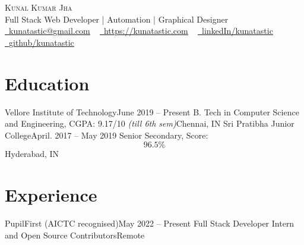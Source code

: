 \documentclass[letterpaper,11pt]{article}
\begin{document}
\begin{center}
    {\Huge \scshape Kunal Kumar Jha} \\ \vspace{1pt}
    Full Stack Web Developer | Automation | Graphical Designer   \\ \vspace{1pt}
    \href{mailto:kunatastic@gmail.com}{\raisebox{-0.2\height}\faEnvelope\  \underline{kunatastic@gmail.com}} ~ 
    \href{https://kunatastic.com}{\raisebox{-0.2\height}\faLink\ \underline{https://kunatastic.com}} ~ 
    \href{https://linkedin.com/in/kunatastic/}{\raisebox{-0.2\height}\faLinkedin\ \underline{linkedIn/kunatastic}}  ~
    \href{https://github.com/kunatatsic}{\raisebox{-0.2\height}\faGithub\ \underline{github/kunatastic}}
    \vspace{-8pt}
\end{center}

\section{Education}
  \resumeSubHeadingListStart
    \resumeSubheading
      {Vellore Institute of Technology}{June 2019 -- Present}
      {B. Tech in Computer Science and Engineering, CGPA: 9.17/10 \emph{(till 6th sem)}}{Chennai, IN}
    \resumeSubheading
      {Sri Pratibha Junior College}{April. 2017 -- May 2019}
      {Senior Secondary, Score: $$96.5\%$$}{Hyderabad, IN}
  \resumeSubHeadingListEnd

\section{Experience}
  \resumeSubHeadingListStart

    \resumeSubheading
      {PupilFirst (AICTC recognised)}{May 2022 -- Present}
      {Full Stack Developer Intern and Open Source Contributors}{Remote}
      \resumeItemListStart
      \resumeItemListEnd
\end{document}
